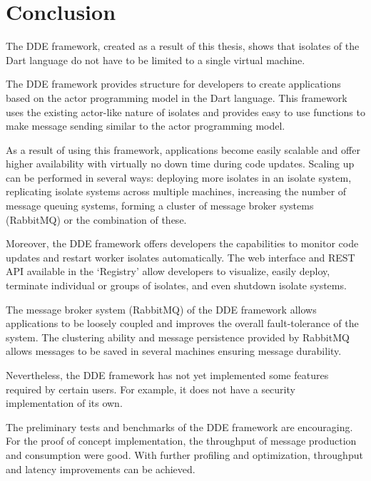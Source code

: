 \chapter{Conclusion}\label{chapter:conclusion}

  The DDE framework, created as a result of this thesis, shows that isolates of the Dart language do not have to be limited to a single virtual machine.

  The DDE framework provides structure for developers to create applications based on the actor programming model in the Dart language. This framework uses the existing actor-like nature of isolates and provides easy to use functions to make message sending similar to the actor programming model.

  As a result of using this framework, applications become easily scalable and offer higher availability with virtually no down time during code updates. Scaling up can be performed in several ways: deploying more isolates in an isolate system, replicating isolate systems across multiple machines, increasing the number of message queuing systems, forming a cluster of message broker systems (RabbitMQ) or the combination of these.

  Moreover, the DDE framework offers developers the capabilities to monitor code updates and restart worker isolates automatically. The web interface and REST API available in the ‘Registry’ allow developers to visualize, easily deploy, terminate individual or groups of isolates, and even shutdown isolate systems.

  The message broker system (RabbitMQ) of the DDE framework allows applications to be loosely coupled and improves the overall fault-tolerance of the system. The clustering ability and message persistence provided by RabbitMQ allows messages to be saved in several machines ensuring message durability.

  Nevertheless, the DDE framework has not yet implemented some features required by certain users. For example, it does not have a security implementation of its own.

  The preliminary tests and benchmarks of the DDE framework are encouraging. For the proof of concept implementation, the throughput of message production and consumption were good. With further profiling and optimization, throughput and latency improvements can be achieved.

